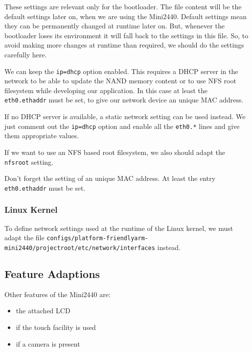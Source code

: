 These settings are relevant only for the bootloader. The file content will be
the default settings later on, when we are using the Mini2440. Default
settings mean they can be permanently changed at runtime later on. But, whenever
the bootloader loses its environment it will fall back to the settings in this
file. So, to avoid making more changes at runtime than required, we should do the
settings carefully here.

We can keep the \texttt{ip=dhcp} option enabled. This requires a DHCP server in
the network to be able to update the NAND memory content or to use NFS root
filesystem while developing our application. In this case at least the
\texttt{eth0.ethaddr} must be set, to give our network device an unique MAC
address.

If no DHCP server is available, a static network setting can be used instead.
We just comment out the \texttt{ip=dhcp} option and enable all the
\texttt{eth0.*} lines and give them appropriate values.

If we want to use an NFS based root filesystem, we also should adapt the
\texttt{nfsroot} setting.

\begin{important}
Don't forget the setting of an unique MAC address. At least the entry
\texttt{eth0.ethaddr} must be set.
\end{important}

\subsubsection{Linux Kernel}			\label{sec:linuxnetwork}

To define network settings used at the runtime of the Linux kernel, we must
adapt the file
\texttt{configs/platform-friendlyarm-mini2440/projectroot/etc/network/interfaces}
instead.

\subsection{Feature Adaptions}		\label{sec:featureadaptions}

Other features of the Mini2440 are:

\begin{itemize}
 \item the attached LCD
 \item if the touch facility is used
 \item if a camera is present
\end{itemize}

